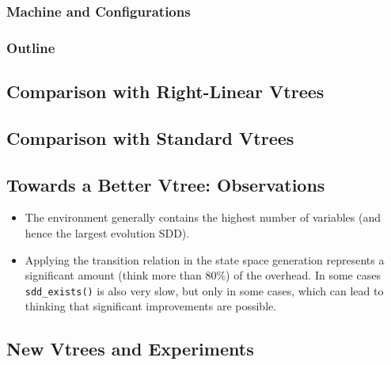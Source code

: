 \documentclass[12]{article}
\begin{document}
\subsubsection{Machine and Configurations} 

\subsubsection{Outline}

\subsection{Comparison with Right-Linear Vtrees}

\subsection{Comparison with Standard Vtrees}

\subsection{Towards a Better Vtree: Observations}

\begin{itemize}
\item The environment generally contains the highest number of variables (and hence the largest evolution SDD). 
\item Applying the transition relation in the state space generation represents a significant amount (think more than 80\%) of the overhead. In some cases \texttt{sdd\_exists()} is also very slow, but only in some cases, which can lead to thinking that significant improvements are possible.
 
\end{itemize}


\subsection{New Vtrees and Experiments}
\end{document}
